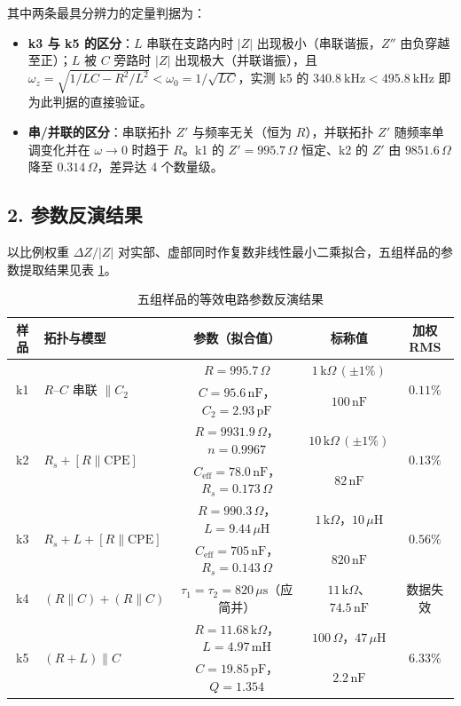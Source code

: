 \documentclass[12pt,a4paper]{ctexart}
\begin{document}
其中两条最具分辨力的定量判据为：
\begin{itemize}
    \item \textbf{k3 与 k5 的区分}：$L$ 串联在支路内时 $|Z|$ 出现极小（串联谐振，$Z''$ 由负穿越至正）；$L$ 被 $C$ 旁路时 $|Z|$ 出现极大（并联谐振），且 $\omega_z=\sqrt{1/LC-R^2/L^2}<\omega_0=1/\sqrt{LC}$，实测 k5 的 $340.8\ \mathrm{kHz}<495.8\ \mathrm{kHz}$ 即为此判据的直接验证。
    \item \textbf{串/并联的区分}：串联拓扑 $Z'$ 与频率无关（恒为 $R$），并联拓扑 $Z'$ 随频率单调变化并在 $\omega\to0$ 时趋于 $R$。k1 的 $Z'=995.7\,\Omega$ 恒定、k2 的 $Z'$ 由 $9851.6\,\Omega$ 降至 $0.314\,\Omega$，差异达 4 个数量级。
\end{itemize}

\subsection*{2. 参数反演结果}
以比例权重 $\Delta Z/|Z|$ 对实部、虚部同时作复数非线性最小二乘拟合，五组样品的参数提取结果见表 \ref{tab:summary}。

\begin{table}[htbp]\centering\small
\caption{五组样品的等效电路参数反演结果}\label{tab:summary}
\begin{tabular}{c|l|c|c|c}
\hline
样品 & 拓扑与模型 & 参数（拟合值） & 标称值 & 加权 RMS \\
\hline
\multirow{2}{*}{k1} & \multirow{2}{*}{$R$--$C$ 串联 $\parallel C_2$} & $R=995.7\,\Omega$ & $1\,\mathrm{k}\Omega\,(\pm1\%)$ & \multirow{2}{*}{$0.11\%$} \\
 & & $C=95.6\,\mathrm{nF}$，$C_2=2.93\,\mathrm{pF}$ & $100\,\mathrm{nF}$ & \\
\hline
\multirow{2}{*}{k2} & \multirow{2}{*}{$R_s+[R\parallel\mathrm{CPE}]$} & $R=9931.9\,\Omega$，$n=0.9967$ & $10\,\mathrm{k}\Omega\,(\pm1\%)$ & \multirow{2}{*}{$0.13\%$} \\
 & & $C_{\mathrm{eff}}=78.0\,\mathrm{nF}$，$R_s=0.173\,\Omega$ & $82\,\mathrm{nF}$ & \\
\hline
\multirow{2}{*}{k3} & \multirow{2}{*}{$R_s+L+[R\parallel\mathrm{CPE}]$} & $R=990.3\,\Omega$，$L=9.44\,\mu\mathrm{H}$ & $1\,\mathrm{k}\Omega$，$10\,\mu\mathrm{H}$ & \multirow{2}{*}{$0.56\%$} \\
 & & $C_{\mathrm{eff}}=705\,\mathrm{nF}$，$R_s=0.143\,\Omega$ & $820\,\mathrm{nF}$ & \\
\hline
k4 & $(R\parallel C)+(R\parallel C)$ & $\tau_1=\tau_2=820\,\mu\mathrm{s}$（应简并） & $11\,\mathrm{k}\Omega$、$74.5\,\mathrm{nF}$ & 数据失效 \\
\hline
\multirow{2}{*}{k5} & \multirow{2}{*}{$(R+L)\parallel C$} & $R=11.68\,\mathrm{k}\Omega$，$L=4.97\,\mathrm{mH}$ & $100\,\Omega$，$47\,\mu\mathrm{H}$ & \multirow{2}{*}{$6.33\%$} \\
 & & $C=19.85\,\mathrm{pF}$，$Q=1.354$ & $2.2\,\mathrm{nF}$ & \\
\hline
\end{tabular}
\end{table}
\end{document}
